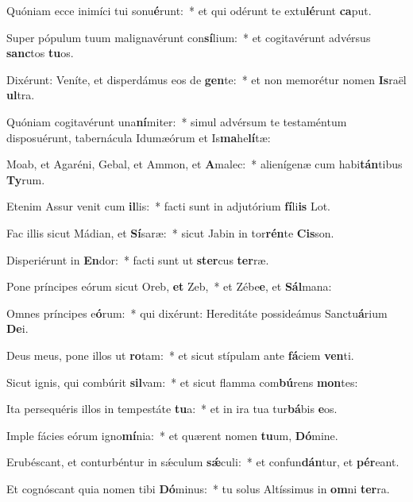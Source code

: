 \item Quóniam ecce inimíci tui sonu\textbf{é}runt:~* et qui odérunt te extu\textbf{lé}runt \textbf{ca}put.
\item Super pópulum tuum malignavérunt con\textbf{sí}lium:~* et cogitavérunt advérsus \textbf{sanc}tos \textbf{tu}os.
\item Dixérunt: Veníte, et disperdámus eos de \textbf{gen}te:~* et non memorétur nomen \textbf{Is}raël \textbf{ul}tra.
\item Quóniam cogitavérunt una\textbf{ní}miter:~* simul advérsum te testaméntum disposuérunt, tabernácula Idumæórum et Is\textbf{ma}he\textbf{lí}tæ:
\item Moab, et Agaréni, Gebal, et Ammon, et \textbf{A}malec:~* alienígenæ cum habi\textbf{tán}tibus \textbf{Ty}rum.
\item Etenim Assur venit cum \textbf{il}lis:~* facti sunt in adjutórium \textbf{fí}li\textbf{is} Lot.
\item Fac illis sicut Mádian, et \textbf{Sí}saræ:~* sicut Jabin in tor\textbf{rén}te \textbf{Cis}son.
\item Disperiérunt in \textbf{En}dor:~* facti sunt ut \textbf{ster}cus \textbf{ter}ræ.
\item Pone príncipes eórum sicut Oreb, \textbf{et} Zeb,~* et Zébe\textbf{e}, et \textbf{Sál}mana:
\item Omnes príncipes e\textbf{ó}rum:~* qui dixérunt: Hereditáte possideámus Sanctu\textbf{á}rium \textbf{De}i.
\item Deus meus, pone illos ut \textbf{ro}tam:~* et sicut stípulam ante \textbf{fá}ciem \textbf{ven}ti.
\item Sicut ignis, qui combúrit \textbf{sil}vam:~* et sicut flamma com\textbf{bú}rens \textbf{mon}tes:
\item Ita persequéris illos in tempestáte \textbf{tu}a:~* et in ira tua tur\textbf{bá}bis \textbf{e}os.
\item Imple fácies eórum igno\textbf{mí}nia:~* et quærent nomen \textbf{tu}um, \textbf{Dó}mine.
\item Erubéscant, et conturbéntur in sǽculum \textbf{sǽ}culi:~* et confun\textbf{dán}tur, et \textbf{pér}eant.
\item Et cognóscant quia nomen tibi \textbf{Dó}minus:~* tu solus Altíssimus in \textbf{om}ni \textbf{ter}ra.
